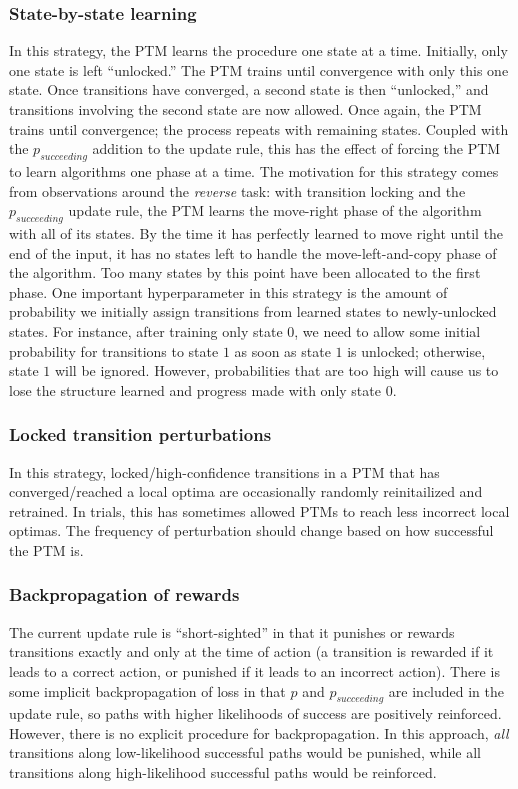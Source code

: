 \documentclass{article}
\begin{document}
\subsubsection{State-by-state learning}
In this strategy, the PTM learns the procedure one state at a time. Initially, only one state is left ``unlocked.'' The PTM trains until convergence with only this one state. Once transitions have converged, a second state is then ``unlocked,'' and transitions involving the second state are now allowed. Once again, the PTM trains until convergence; the process repeats with remaining states. Coupled with the $p_{succeeding}$ addition to the update rule, this has the effect of forcing the PTM to learn algorithms one phase at a time. 
The motivation for this strategy comes from observations around the \textit{reverse} task: with transition locking and the $p_{succeeding}$ update rule, the PTM learns the move-right phase of the algorithm with all of its states. By the time it has perfectly learned to move right until the end of the input, it has no states left to handle the move-left-and-copy phase of the algorithm. Too many states by this point have been allocated to the first phase.
One important hyperparameter in this strategy is the amount of probability we initially assign transitions from learned states to newly-unlocked states. For instance, after training only state $0$, we need to allow some initial probability for transitions to state $1$ as soon as state $1$ is unlocked; otherwise, state $1$ will be ignored. However, probabilities that are too high will cause us to lose the structure learned and progress made with only state $0$.  

\subsubsection{Locked transition perturbations}
In this strategy, locked/high-confidence transitions in a PTM that has converged/reached a local optima are occasionally randomly reinitailized and retrained. In trials, this has sometimes allowed PTMs to reach less incorrect local optimas. The frequency of perturbation should change based on how successful the PTM is.

\subsubsection{Backpropagation of rewards}
The current update rule is ``short-sighted'' in that it punishes or rewards transitions exactly and only at the time of action (a transition is rewarded if it leads to a correct action, or punished if it leads to an incorrect action). There is some implicit backpropagation of loss in that $p$ and $p_{succeeding}$ are included in the update rule, so paths with higher likelihoods of success are positively reinforced. However, there is no explicit procedure for backpropagation. In this approach, \textit{all} transitions along low-likelihood successful paths would be punished, while all transitions along high-likelihood successful paths would be reinforced.
\end{document}
